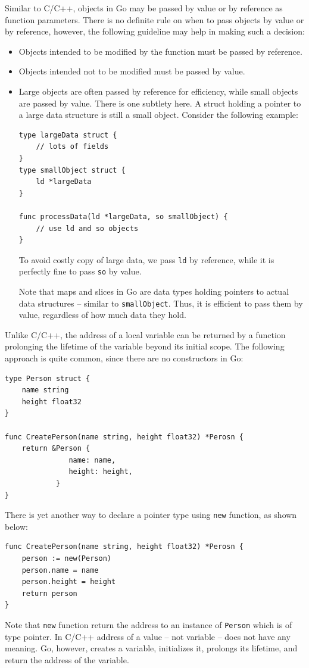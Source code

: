\documentclass[11pt]{article}
\begin{document}
Similar to C/C++, objects in Go may be passed by value or by reference as function parameters. There is no definite rule on when to pass objects by value or by reference, however, the following guideline may help in making such a decision:
\begin{itemize}
\item Objects intended to be modified by the function must be passed by reference.
\item Objects intended not to be modified must be passed by value.
\item Large objects are often passed by reference for efficiency, while small objects are passed by value. There is one subtlety here. A struct holding a pointer to a large data structure is still a small object. Consider the following example:
\begin{verbatim}
type largeData struct {
    // lots of fields
}
type smallObject struct {
    ld *largeData
}

func processData(ld *largeData, so smallObject) {
    // use ld and so objects
}
\end{verbatim}
To avoid costly copy of large data, we pass \texttt{ld} by reference, while it is perfectly fine to pass \texttt{so} by value.

Note that maps and slices in Go are data types holding pointers to actual data structures -- similar to \texttt{smallObject}. Thus, it is efficient to pass them by value, regardless of how much data they hold.
\end{itemize}

Unlike C/C++, the address of a local variable can be returned by a function prolonging the lifetime of the variable beyond its initial scope. The following approach is quite common, since there are no constructors in Go:
\begin{verbatim}
type Person struct {
    name string
    height float32
}

func CreatePerson(name string, height float32) *Perosn {
    return &Person {
               name: name,
               height: height,
            }
}
\end{verbatim}
There is yet another way to declare a pointer type using \texttt{new} function, as shown below:
\begin{verbatim}
func CreatePerson(name string, height float32) *Perosn {
    person := new(Person)
    person.name = name
    person.height = height
    return person
}
\end{verbatim}
Note that \texttt{new} function return the address to an instance of \texttt{Person} which is of type pointer. In C/C++ address of a value -- not variable -- does not have any meaning. Go, however, creates a variable, initializes it, prolongs its lifetime, and return the address of the variable.
\end{document}
